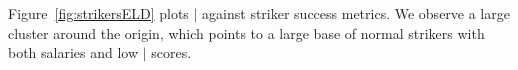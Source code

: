{	 Figure~\ref{fig:strikersELD} plots $\mid$ against striker success metrics. We observe a large cluster around the origin, which points to a large base of normal strikers with both salaries and low $\mid$ scores. %
	 


	\begin{figure}
		\centering     %

\end{figure}}
